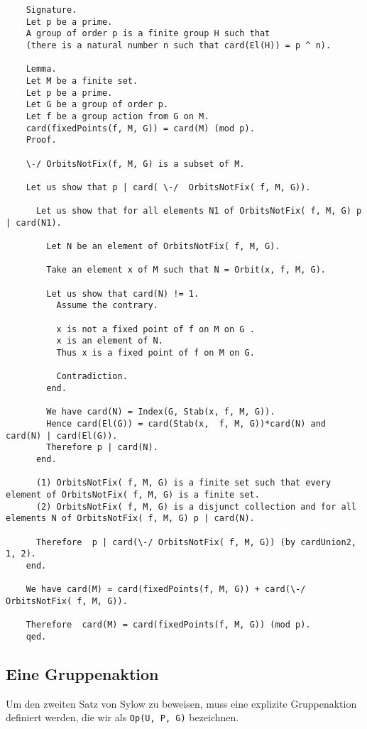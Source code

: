 \documentclass[a4paper,12pt]{scrartcl}
\begin{document}
\begin{lstlisting}
	Signature.
	Let p be a prime.
	A group of order p is a finite group H such that
	(there is a natural number n such that card(El(H)) = p ^ n).
	
	Lemma.
	Let M be a finite set.
	Let p be a prime.
	Let G be a group of order p.
	Let f be a group action from G on M.
	card(fixedPoints(f, M, G)) = card(M) (mod p).
	Proof.
	
	\-/ OrbitsNotFix(f, M, G) is a subset of M.
	
	Let us show that p | card( \-/  OrbitsNotFix( f, M, G)).
	
	  Let us show that for all elements N1 of OrbitsNotFix( f, M, G) p | card(N1).
	
		Let N be an element of OrbitsNotFix( f, M, G).
	
		Take an element x of M such that N = Orbit(x, f, M, G).
		
		Let us show that card(N) != 1.
		  Assume the contrary.
		   
		  x is not a fixed point of f on M on G .
		  x is an element of N.
		  Thus x is a fixed point of f on M on G.
	
		  Contradiction.
		end.
	
		We have card(N) = Index(G, Stab(x, f, M, G)).
		Hence card(El(G)) = card(Stab(x,  f, M, G))*card(N) and card(N) | card(El(G)).
		Therefore p | card(N).
	  end.
	
	  (1) OrbitsNotFix( f, M, G) is a finite set such that every element of OrbitsNotFix( f, M, G) is a finite set.
	  (2) OrbitsNotFix( f, M, G) is a disjunct collection and for all elements N of OrbitsNotFix( f, M, G) p | card(N).
	
	  Therefore  p | card(\-/ OrbitsNotFix( f, M, G)) (by cardUnion2, 1, 2).
	end.
	
	We have card(M) = card(fixedPoints(f, M, G)) + card(\-/ OrbitsNotFix( f, M, G)).
	
	Therefore  card(M) = card(fixedPoints(f, M, G)) (mod p).
	qed.

\end{lstlisting}

\subsection{Eine Gruppenaktion}

Um den zweiten Satz von Sylow zu beweisen, muss eine explizite Gruppenaktion definiert werden, die wir als \verb!Op(U, P, G)! bezeichnen.
\end{document}
